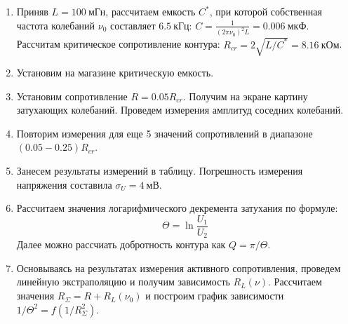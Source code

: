 \documentclass[14pt, a4paper]{report}
\begin{document}
\begin{enumerate}

\setcounter{enumi}{0}

\item Приняв $L=100\ мГн$, рассчитаем емкость $C^*$, при которой собственная частота колебаний $\nu_0$ составляет $6.5\ кГц$: $C=\frac{1}{(2\pi\nu_0)^2L}=0.006\ мкФ$. Рассчитам критическое сопротивление контура: $R_{cr}=2\sqrt{L/C^*}=8.16\ кОм$.

\item Установим на магазине критическую емкость.

\item Установим сопротивление $R=0.05R_{cr}$. Получим на экране картину затухающих колебаний. Проведем измерения амплитуд соседних колебаний.

\item Повторим измерения для еще 5 значений сопротивлений в диапазоне $(0.05-0.25)R_{cr}$.

\item Занесем результаты измерений в таблицу. Погрешность измерения напряжения составила $\sigma_U=4\ мВ$.

\item Рассчитаем значения логарифмического декремента затухания по формуле:
\[\Theta=\ln{\frac{U_1}{U_2}}\]
Далее можно рассчиать добротность контура как $Q=\pi/\Theta$.

\begin{table}[H]
\centering
{}
\caption{Результаты измерения амплитуд соседних колебаний}
\end{table}

\item Основываясь на результатах измерения активного сопротивления, проведем линейную экстраполяцию и получим зависимость $R_L(\nu)$. Рассчитаем значения $R_{\Sigma}=R+R_L(\nu_0)$ и построим график зависимости $1/\Theta^2=f(1/R_{\Sigma}^2)$.


\end{enumerate}
\end{document}
